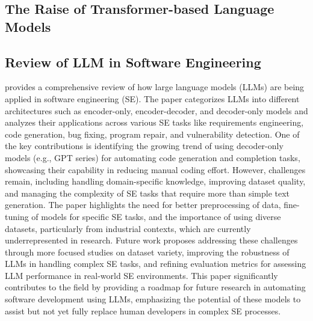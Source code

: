 
\subsection{The Raise of Transformer-based Language Models}

\subsection{Review of LLM in Software Engineering}
\citep{hou2023large} provides a comprehensive review of how large language models (LLMs) are being applied in software engineering (SE). The paper categorizes LLMs into different architectures such as encoder-only, encoder-decoder, and decoder-only models and analyzes their applications across various SE tasks like requirements engineering, code generation, bug fixing, program repair, and vulnerability detection. One of the key contributions is identifying the growing trend of using decoder-only models (e.g., GPT series) for automating code generation and completion tasks, showcasing their capability in reducing manual coding effort. However, challenges remain, including handling domain-specific knowledge, improving dataset quality, and managing the complexity of SE tasks that require more than simple text generation. The paper highlights the need for better preprocessing of data, fine-tuning of models for specific SE tasks, and the importance of using diverse datasets, particularly from industrial contexts, which are currently underrepresented in research. Future work proposes addressing these challenges through more focused studies on dataset variety, improving the robustness of LLMs in handling complex SE tasks, and refining evaluation metrics for assessing LLM performance in real-world SE environments. This paper significantly contributes to the field by providing a roadmap for future research in automating software development using LLMs, emphasizing the potential of these models to assist but not yet fully replace human developers in complex SE processes. 

